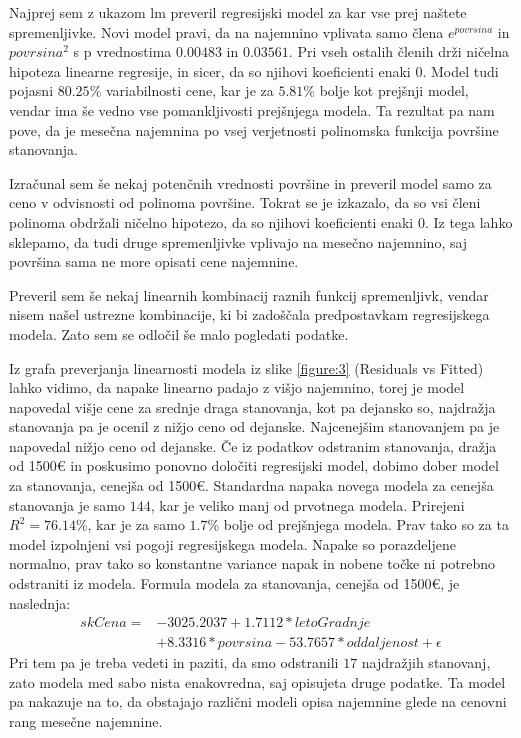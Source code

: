 \documentclass[a4paper, 12pt]{article}
\begin{document}
Najprej sem z ukazom {\sf lm} preveril regresijski model za kar vse prej
naštete spremenljivke. Novi model pravi, da na najemnino vplivata samo člena
$ e^{povrsina} $ in $ povrsina^{2} $ s p vrednostima $ 0.00483 $ in $ 0.03561 $.
Pri vseh ostalih členih drži ničelna hipoteza linearne regresije, in sicer, da
so njihovi koeficienti enaki $ 0 $. Model tudi pojasni $ 80.25\% $ variabilnosti
cene, kar je za $ 5.81\% $ bolje kot prejšnji model, vendar ima še vedno vse
pomankljivosti prejšnjega modela. Ta rezultat pa nam pove, da je mesečna
najemnina po vsej verjetnosti polinomska funkcija površine stanovanja.

Izračunal sem še nekaj potenčnih vrednosti površine in preveril model samo za
ceno v odvisnosti od polinoma površine. Tokrat se je izkazalo, da so vsi členi
polinoma obdržali ničelno hipotezo, da so njihovi koeficienti enaki $ 0 $. Iz
tega lahko sklepamo, da tudi druge spremenljivke vplivajo na mesečno najemnino,
saj površina sama ne more opisati cene najemnine.

Preveril sem še nekaj linearnih kombinacij raznih funkcij spremenljivk, vendar
nisem našel ustrezne kombinacije, ki bi zadoščala predpostavkam regresijskega
modela. Zato sem se odločil še malo pogledati podatke.

Iz grafa preverjanja linearnosti modela iz slike \ref{figure:3}
(Residuals vs Fitted) lahko vidimo, da napake linearno padajo z višjo najemnino, torej
je model napovedal višje cene za srednje draga stanovanja, kot pa dejansko so,
najdražja stanovanja pa je ocenil z nižjo ceno od dejanske. Najcenejšim
stanovanjem pa je napovedal nižjo ceno od dejanske. Če iz podatkov
odstranim stanovanja, dražja od 1500€ in poskusimo ponovno določiti regresijski
model, dobimo dober model za stanovanja, cenejša od 1500€. Standardna napaka
novega modela za cenejša stanovanja je samo $ 144 $, kar je veliko manj od
prvotnega modela. Prirejeni $ R^{2} = 76.14\% $, kar je za samo $ 1.7\% $ bolje
od prejšnjega modela. Prav tako so za ta model izpolnjeni vsi pogoji
regresijskega modela. Napake so porazdeljene normalno, prav tako so konstantne
variance napak in nobene točke ni potrebno odstraniti iz modela. Formula modela
za stanovanja, cenejša od 1500€, je naslednja:
\begin{equation}
\begin{split}
	skCena = &-3025.2037+1.7112*letoGradnje \\
			&+8.3316*povrsina-53.7657*oddaljenost+\epsilon
\end{split}
\end{equation}
Pri tem pa je treba vedeti in paziti, da smo odstranili $ 17 $ najdražjih
stanovanj, zato modela med sabo nista enakovredna, saj opisujeta druge
podatke. Ta model pa nakazuje na to, da obstajajo različni modeli opisa
najemnine glede na cenovni rang mesečne najemnine.
\end{document}

